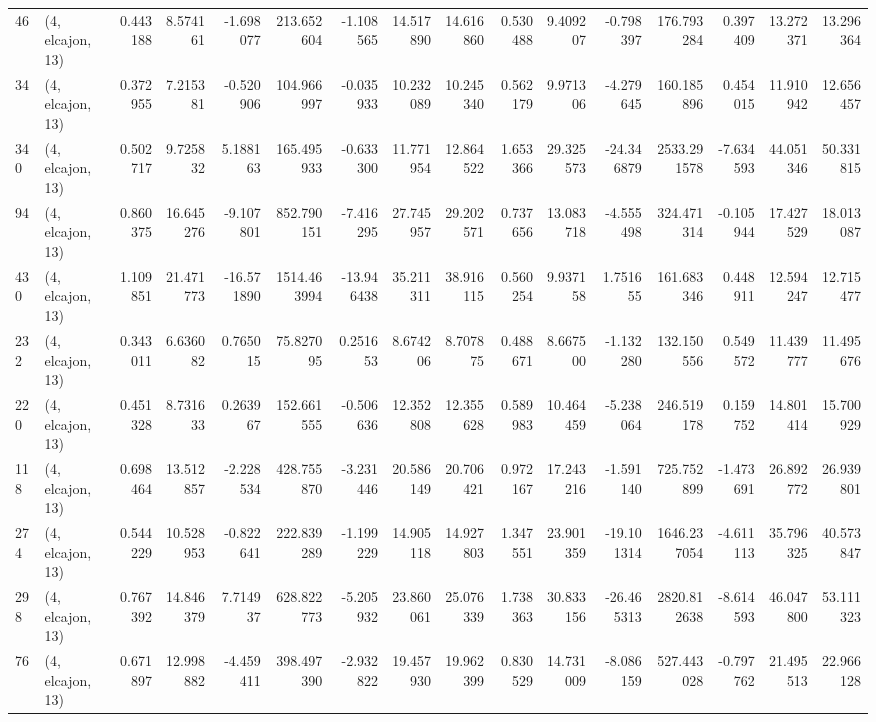 \begin{tabular}{llrrrrrrrrrrrrrr}
46  &  (4, elcajon, 13) &   0.443188 &   8.574161 &  -1.698077 &   213.652604 &  -1.108565 &  14.517890 &  14.616860 &  0.530488 &   9.409207 &  -0.798397 &   176.793284 &  0.397409 &  13.272371 &  13.296364 \\
34  &  (4, elcajon, 13) &   0.372955 &   7.215381 &  -0.520906 &   104.966997 &  -0.035933 &  10.232089 &  10.245340 &  0.562179 &   9.971306 &  -4.279645 &   160.185896 &  0.454015 &  11.910942 &  12.656457 \\
340 &  (4, elcajon, 13) &   0.502717 &   9.725832 &   5.188163 &   165.495933 &  -0.633300 &  11.771954 &  12.864522 &  1.653366 &  29.325573 & -24.346879 &  2533.291578 & -7.634593 &  44.051346 &  50.331815 \\
94  &  (4, elcajon, 13) &   0.860375 &  16.645276 &  -9.107801 &   852.790151 &  -7.416295 &  27.745957 &  29.202571 &  0.737656 &  13.083718 &  -4.555498 &   324.471314 & -0.105944 &  17.427529 &  18.013087 \\
430 &  (4, elcajon, 13) &   1.109851 &  21.471773 & -16.571890 &  1514.463994 & -13.946438 &  35.211311 &  38.916115 &  0.560254 &   9.937158 &   1.751655 &   161.683346 &  0.448911 &  12.594247 &  12.715477 \\
232 &  (4, elcajon, 13) &   0.343011 &   6.636082 &   0.765015 &    75.827095 &   0.251653 &   8.674206 &   8.707875 &  0.488671 &   8.667500 &  -1.132280 &   132.150556 &  0.549572 &  11.439777 &  11.495676 \\
220 &  (4, elcajon, 13) &   0.451328 &   8.731633 &   0.263967 &   152.661555 &  -0.506636 &  12.352808 &  12.355628 &  0.589983 &  10.464459 &  -5.238064 &   246.519178 &  0.159752 &  14.801414 &  15.700929 \\
118 &  (4, elcajon, 13) &   0.698464 &  13.512857 &  -2.228534 &   428.755870 &  -3.231446 &  20.586149 &  20.706421 &  0.972167 &  17.243216 &  -1.591140 &   725.752899 & -1.473691 &  26.892772 &  26.939801 \\
274 &  (4, elcajon, 13) &   0.544229 &  10.528953 &  -0.822641 &   222.839289 &  -1.199229 &  14.905118 &  14.927803 &  1.347551 &  23.901359 & -19.101314 &  1646.237054 & -4.611113 &  35.796325 &  40.573847 \\
298 &  (4, elcajon, 13) &   0.767392 &  14.846379 &   7.714937 &   628.822773 &  -5.205932 &  23.860061 &  25.076339 &  1.738363 &  30.833156 & -26.465313 &  2820.812638 & -8.614593 &  46.047800 &  53.111323 \\
76  &  (4, elcajon, 13) &   0.671897 &  12.998882 &  -4.459411 &   398.497390 &  -2.932822 &  19.457930 &  19.962399 &  0.830529 &  14.731009 &  -8.086159 &   527.443028 & -0.797762 &  21.495513 &  22.966128 \\

\end{tabular}
